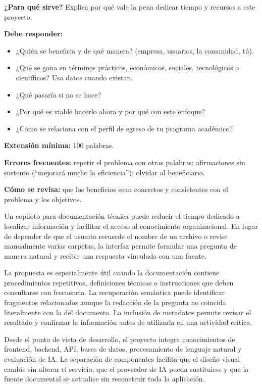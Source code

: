 \begin{guia}
\textbf{¿Para qué sirve?} Explica por qué vale la pena dedicar tiempo y recursos a este proyecto.

\textbf{Debe responder:}
\begin{itemize}[nosep,leftmargin=*]
  \item ¿Quién se beneficia y de qué manera? (empresa, usuarios, la comunidad, tú).
  \item ¿Qué se gana en términos prácticos, económicos, sociales, tecnológicos o científicos? Usa datos cuando existan.
  \item ¿Qué pasaría si no se hace?
  \item ¿Por qué es viable hacerlo ahora y por qué con este enfoque?
  \item ¿Cómo se relaciona con el perfil de egreso de tu programa académico?
\end{itemize}

\textbf{Extensión mínima:} 100 palabras.

\textbf{Errores frecuentes:} repetir el problema con otras palabras; afirmaciones sin sustento (``mejorará mucho la
eficiencia''); olvidar al beneficiario.

\textbf{Cómo se revisa:} que los beneficios sean concretos y consistentes con el problema y los objetivos.
\end{guia}

Un copiloto para documentación técnica puede reducir el tiempo dedicado a localizar información y facilitar el acceso al conocimiento organizacional. En lugar de depender de que el usuario recuerde el nombre de un archivo o revise manualmente varias carpetas, la interfaz permite formular una pregunta de manera natural y recibir una respuesta vinculada con una fuente.

La propuesta es especialmente útil cuando la documentación contiene procedimientos repetitivos, definiciones técnicas o instrucciones que deben consultarse con frecuencia. La recuperación semántica puede identificar fragmentos relacionados aunque la redacción de la pregunta no coincida literalmente con la del documento. La inclusión de metadatos permite revisar el resultado y confirmar la información antes de utilizarla en una actividad crítica.

Desde el punto de vista de desarrollo, el proyecto integra conocimientos de frontend, backend, API, bases de datos, procesamiento de lenguaje natural y evaluación de IA. La separación de componentes facilita que el diseño visual cambie sin alterar el servicio, que el proveedor de IA pueda sustituirse y que la fuente documental se actualice sin reconstruir toda la aplicación.

